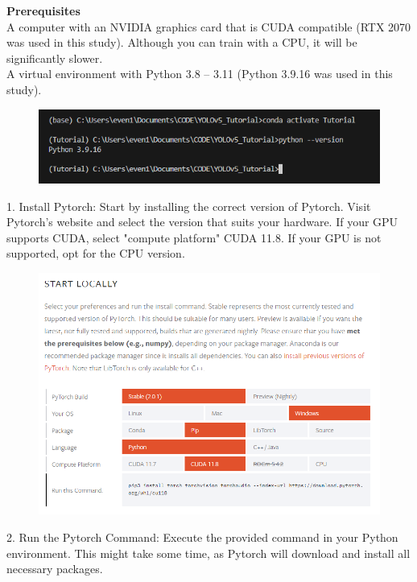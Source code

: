 \textbf{Prerequisites}\\

A computer with an NVIDIA graphics card that is CUDA compatible (RTX 2070 was used in this study). Although you can train with a CPU, it will be significantly slower.\\
A virtual environment with Python 3.8 – 3.11 (Python 3.9.16 was used in this study).

\begin{figure}[H]
    \centering
    \includegraphics[scale=0.5]{evenbilder/tutorial/tutorial-1.png}
    \label{fig:tutorial-1}
\end{figure}

1.	Install Pytorch: Start by installing the correct version of Pytorch. Visit Pytorch's website and select the version that suits your hardware. If your GPU supports CUDA, select "compute platform" CUDA 11.8. If your GPU is not supported, opt for the CPU version.\\

\begin{figure}[H]
    \centering
    \includegraphics[scale=0.5]{evenbilder/tutorial/tutorial-2.png}
    \label{fig:tutorial-2}
\end{figure}

2.	Run the Pytorch Command: Execute the provided command in your Python environment. This might take some time, as Pytorch will download and install all necessary packages.\\

